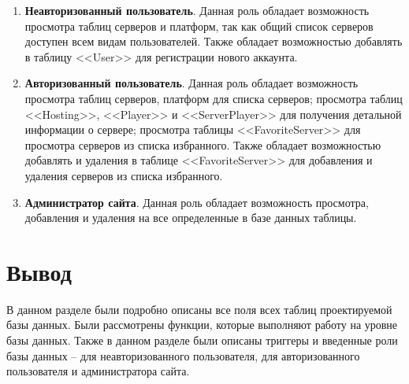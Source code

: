 \begin{enumerate}
    \item \textbf{Неавторизованный пользователь}. Данная роль обладает возможность просмотра таблиц серверов и платформ, так как общий список серверов доступен всем видам пользователей. Также обладает возможностью добавлять в таблицу <<User>> для регистрации нового аккаунта.
    \item \textbf{Авторизованный пользователь}. Данная роль обладает возможность просмотра таблиц серверов, платформ для списка серверов; просмотра таблиц <<Hosting>>, <<Player>> и <<ServerPlayer>> для получения детальной информации о сервере; просмотра таблицы <<FavoriteServer>> для просмотра серверов из списка избранного. Также обладает возможностью добавлять и удаления в таблице <<FavoriteServer>> для добавления и удаления серверов из списка избранного.
    \item \textbf{Администратор сайта}. Данная роль обладает возможность просмотра, добавления и удаления на все определенные в базе данных таблицы.
\end{enumerate}


\section*{Вывод}

В данном разделе были подробно описаны все поля всех таблиц проектируемой базы данных. Были рассмотрены функции, которые выполняют работу на уровне базы данных. Также в данном разделе были описаны триггеры и введенные роли базы данных -- для неавторизованного пользователя, для авторизованного пользователя и администратора сайта.
